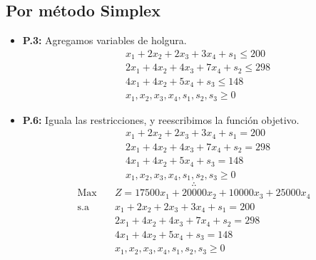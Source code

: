 \documentclass{templateNote}
\begin{document}
\subsection*{Por método Simplex}
\begin{itemize}
    \item \textbf{P.3:} Agregamos variables de holgura.
    \begin{equation*}
        \begin{aligned}
            & x_1 + 2x_2 + 2x_3 + 3x_4 + s_1 \leq 200 \\
            & 2x_1 + 4x_2 + 4x_3 + 7x_4 + s_2 \leq 298 \\
            & 4x_1 + 4x_2 + 5x_4 + s_3 \leq 148 \\
            & x_1, x_2, x_3, x_4, s_1, s_2, s_3 \geq 0
        \end{aligned}
    \end{equation*}

    \item \textbf{P.6:} Iguala las restricciones, y reescribimos la función objetivo.
    \begin{equation*}
        \begin{aligned}
            & x_1 + 2x_2 + 2x_3 + 3x_4 + s_1 = 200 \\
            & 2x_1 + 4x_2 + 4x_3 + 7x_4 + s_2 = 298 \\
            & 4x_1 + 4x_2 + 5x_4 + s_3 = 148 \\
            & x_1, x_2, x_3, x_4, s_1, s_2, s_3 \geq 0
        \end{aligned}
    \end{equation*}
    \begin{equation*}
        \therefore
    \end{equation*}
    \begin{equation*}
        \begin{aligned}
            \text{Max} \quad & Z = 17500x_1 + 20000x_2 + 10000x_3 + 25000x_4 \\
            \text{s.a} \quad & x_1 + 2x_2 + 2x_3 + 3x_4 + s_1 = 200 \\
            & 2x_1 + 4x_2 + 4x_3 + 7x_4 + s_2 = 298 \\
            & 4x_1 + 4x_2 + 5x_4 + s_3 = 148 \\
            & x_1, x_2, x_3, x_4, s_1, s_2, s_3 \geq 0
        \end{aligned}
    \end{equation*}


\end{itemize}
\end{document}

